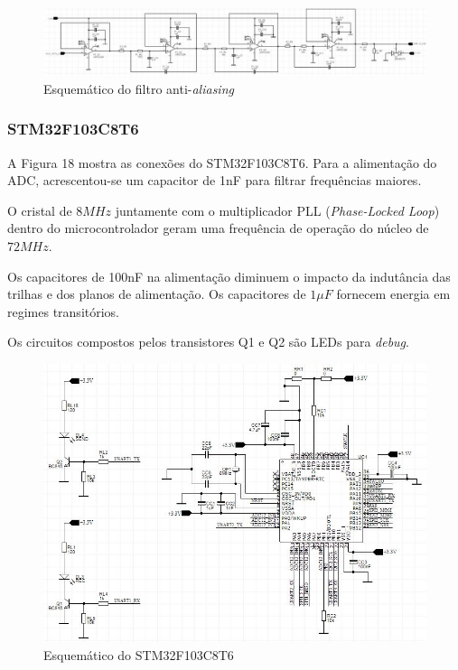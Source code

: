 \documentclass[
	12pt,				%
	openright,			%
	twoside,			%
	a4paper,			%
	english,			%
	french,				%
	spanish,			%
	brazil,				%
	]{abntex2}
\begin{document}
				\begin{landscape}
					\vspace*{\fill}
					\begin{center}
						\begin{figure}[!h]
							\centering
							\includegraphics[scale = 0.8]{../Fotos/FAAesquematico.jpg}
							\caption{Esquemático do filtro anti-\textit{aliasing}}
						\end{figure}
					\end{center}
					\vspace*{\fill}
					
				\end{landscape}

			\subsubsection{STM32F103C8T6}

				A Figura 18 mostra as conexões do STM32F103C8T6. Para a
				alimentação do ADC, acrescentou-se um capacitor de 1nF para
				filtrar frequências maiores.

				O cristal de $8MHz$ juntamente com o multiplicador PLL
				(\textit{Phase-Locked Loop}) dentro do microcontrolador
				geram uma frequência de operação do núcleo de $72MHz$.

				Os capacitores de 100nF na alimentação diminuem o impacto
				da indutância das trilhas e dos planos de alimentação. Os
				capacitores de $1\mu F$ fornecem energia em regimes
				transitórios.

				Os circuitos compostos pelos transistores Q1 e Q2 são LEDs
				para \textit{debug}.

				\begin{figure}[!ht]
					\centering
					\includegraphics[width=\linewidth]{../Fotos/stmEsquematico.jpg}
					\caption{Esquemático do STM32F103C8T6}
				\end{figure}
\end{document}
